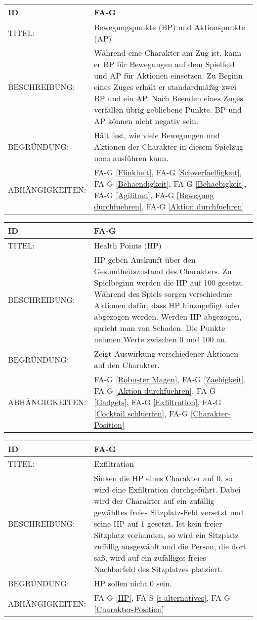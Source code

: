 \begin{tabularx}{16cm}{l|X}
	{table}\label{BP und AP}
	\textbf{ID} & \textbf{FA-G \arabic{table}} \\
	\hline
	TITEL: & Bewegungspunkte (BP) und Aktionspunkte (AP) \\
	\hline
	BESCHREIBUNG: & Während eine Charakter am Zug ist, kann er BP für Bewegungen auf dem Spielfeld und AP für Aktionen einsetzen.
	Zu Beginn eines Zuges erhält er standardmäßig zwei BP und ein AP. Nach Beenden eines Zuges verfallen übrig gebliebene Punkte. BP und AP können nicht negativ sein.\\
	\hline
	BEGRÜNDUNG: & Hält fest, wie viele Bewegungen und Aktionen der Charakter in diesem Spielzug noch ausführen kann. \\
	\hline
	ABHÄNGIGKEITEN: & FA-G \ref{Flinkheit}, FA-G \ref{Schwerfaelligkeit}, FA-G \ref{Behaendigkeit}, FA-G \ref{Behaebigkeit}, FA-G \ref{Agilitaet}, FA-G \ref{Bewegung durchfuehren}, FA-G \ref{Aktion durchfuehren}\\
\end{tabularx}

\begin{tabularx}{16cm}{l|X}
	{table}\label{HP}
	\textbf{ID} & \textbf{FA-G \arabic{table}} \\
	\hline
	TITEL: & Health Points (HP) \\
	\hline
	BESCHREIBUNG: & HP geben Auskunft über den Gesundheitszustand des Charakters. Zu Spielbeginn werden die HP auf 100 gesetzt. Während des Spiels sorgen verschiedene Aktionen dafür, dass HP hinzugefügt oder abgezogen werden. Werden HP abgezogen, spricht man von Schaden. Die Punkte nehmen Werte zwischen 0 und 100 an.\\
	\hline
	BEGRÜNDUNG: & Zeigt Auswirkung verschiedener Aktionen auf den Charakter. \\
	\hline
	ABHÄNGIGKEITEN: & FA-G \ref{Robuster Magen}, FA-G \ref{Zaehigkeit}, FA-G \ref{Aktion durchfuehren}, FA-G \ref{Gadgets}, FA-G \ref{Exfiltration}, FA-G \ref{Cocktail schluerfen}, FA-G \ref{Charakter-Position}\\
\end{tabularx}

\begin{tabularx}{16cm}{l|X}
	{table}\label{Exfiltration}
	\textbf{ID} & \textbf{FA-G \arabic{table}} \\
	\hline
	TITEL: & Exfiltration \\
	\hline
	BESCHREIBUNG: & Sinken die HP eines Charakter auf 0, so wird eine Exfiltration durchgeführt. Dabei wird der Charakter auf ein zufällig gewähltes freies Sitzplatz-Feld versetzt und seine HP auf 1 gesetzt. Ist kein freier Sitzplatz vorhanden, so wird ein Sitzplatz zufällig ausgewählt und die Person, die dort saß, wird auf ein zufälliges freies Nachbarfeld des Sitzplatzes platziert.\\
	\hline
	BEGRÜNDUNG: & HP sollen nicht 0 sein.\\
	\hline
	ABHÄNGIGKEITEN: & FA-G \ref{HP}, FA-S \ref{s-alternatives}, FA-G \ref{Charakter-Position}\\
\end{tabularx}


